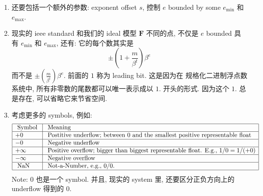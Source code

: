 \documentclass[lang=cn,11pt]{elegantbook}
\begin{document}
\begin{enumerate}
    \item 还要包括一个额外的参数: exponent offset $s$, 控制 $e$ bounded by some $e_{\min}$ 和  $e_{\max}$.
    \item 现实的 ieee standard 和我们的 ideal 模型 $\mathbf{F}$ 不同的点, 不仅是 $e$ bounded 具有 $e_{\min}$ 和  $e_{\max}$, 还有: 它的每个数其实是  \[ \pm (1+\frac{m}{\beta^t})\beta^e\] 而不是 \(\pm (\frac{m}{\beta^t})\beta^e\). 前面的 $1$ 称为 leading bit. 这是因为在 规格化二进制浮点数系统中, 所有非零数的尾数都可以唯一表示成以 $1.$ 开头的形式. 因为这个 $1.$  总是存在, 可以省略它来节省空间.
    \item 考虑更多的 symbols, 例如: $$
\begin{array}{|l|l|}
\hline \text { Symbol } & \text { Meaning } \\
\hline+0 & \text { Postitive underflow; between } 0 \text { and the smallest positive representable float } \\
\hline-0 & \text { Negative underflow } \\
\hline+\infty & \text { Positive overflow; bigger than biggest representable float. E.g., } 1 / 0=1 /(+0) \\
\hline-\infty & \text { Negative overflow } \\
\hline \text { NaN } & \text { Not-a-Number, e.g., 0/0. } \\
\hline
\end{array}
$$ Note: $0$ 也是一个 symbol. 并且, 现实的 system 里, 还要区分正负方向上的 underflow 得到的 $0$.
\end{enumerate}
\end{document}
